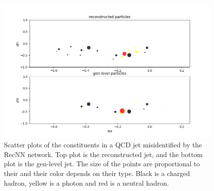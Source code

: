 \begin{figure}
    \centering
    \includegraphics[width=\textwidth]{Images/display.png}
    \caption{Scatter plots of the constituents in a QCD jet misidentified by the RecNN network. Top plot is the reconstructed jet, and the bottom plot is the gen-level jet. The size of the points are proportional to their \pt and their color depends on their type. Black is a charged hadron, yellow is a photon and red is a neutral hadron.}
    \label{fig:jet_display}
\end{figure}